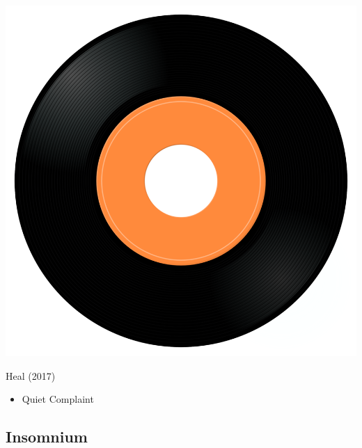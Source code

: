 \begin{minipage}[t]{0.25\textwidth}\vspace{0pt}
\captionsetup{type=figure}
\includegraphics[width=\textwidth]{Images/cover.png}
\caption*{Heal (2017)}
\end{minipage}
\begin{minipage}[t]{0.25\textwidth}\vspace{0pt}
\begin{itemize}[nosep,leftmargin=1em,labelwidth=*,align=left]
	\setlength{\itemsep}{0pt}
	\item Quiet Complaint
\end{itemize}
\end{minipage}


\subsection{Insomnium}

